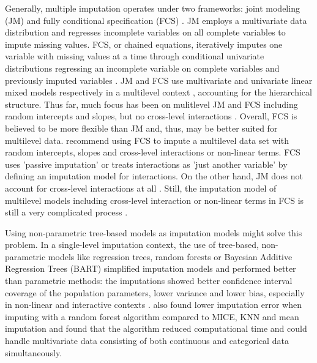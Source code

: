 \documentclass[10pt, a4paper, titlepage]{article}
\begin{document}
Generally, multiple imputation operates under two frameworks: joint modeling (JM) and fully conditional specification (FCS) \citep{mistlerComparisonJointModel2017, buurenFlexibleImputationMissing2018, enders2018, enders2018a, hughes2014}. JM employs a multivariate data distribution and regresses incomplete variables on all complete variables to impute missing values. FCS, or chained equations, iteratively imputes one variable with missing values at a time through conditional univariate distributions regressing an incomplete variable on complete variables and previously imputed variables \citep{mistlerComparisonJointModel2017, buurenFlexibleImputationMissing2018, enders2016, enders2018, enders2018a, hughes2014, grund2018a}. JM and FCS use multivariate and univariate linear mixed models respectively in a multilevel context \citep{mistlerComparisonJointModel2017, enders2018, resche-rigon2018}, accounting for the hierarchical structure. Thus far, much focus has been on mulitlevel JM and FCS including random intercepts and slopes, but no cross-level interactions \cite{grund2018a, grund2016, enders2018, enders2018a, enders2020, enders2016}. Overall, FCS is believed to be more flexible than JM \citep{audigier2018, burgette2010, vanbuuren2007, grund2018a} and, thus, may be better suited for multilevel data. \citet{grund2018} recommend using FCS to impute a multilevel data set with random intercepts, slopes and cross-level interactions or non-linear terms. FCS uses 'passive imputation' or treats interactions as 'just another variable' by defining an imputation model for interactions. On the other hand, JM does not account for cross-level interactions at all \citep{buurenFlexibleImputationMissing2018, grund2018}. Still, the imputation model of multilevel models including cross-level interaction or non-linear terms in FCS is still a very complicated process \citep{grund2021, grund2018}.

Using non-parametric tree-based models as imputation models might solve this problem. In a single-level imputation context, the use of tree-based, non-parametric models like regression trees, random forests or Bayesian Additive Regression Trees (BART) simplified imputation models and performed better than parametric methods: the imputations showed better confidence interval coverage of the population parameters, lower variance and lower bias, especially in non-linear and interactive contexts \citep{burgette2010, xu2016, silva2022}. \citet{waljee2013} also found lower imputation error when imputing with a random forest algorithm compared to MICE, KNN and mean imputation and \citet{stekhoven2012} found that the algorithm reduced computational time and could handle multivariate data consisting of both continuous and categorical data simultaneously.
\end{document}
